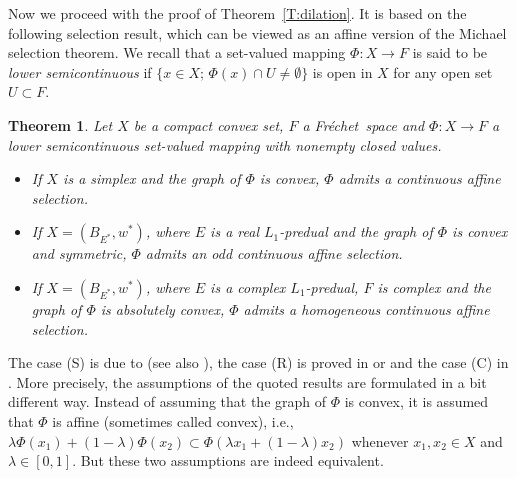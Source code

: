 \documentclass{amsart}
\numberwithin{equation}{section}
\newtheorem{thm}{Theorem}[section]
\theoremstyle{definition}
\newcommand{\setsep}{;\,}
\newcommand{\fr}{Fr\'echet\ }
\begin{document}
Now we proceed with the proof of Theorem~\ref{T:dilation}. It is based on the following selection result, which can be viewed as an affine version of the Michael selection theorem. We recall that a set-valued mapping $\Phi\colon X\to F$ is said to be
\emph{lower semicontinuous} if $\{x\in X\setsep \Phi(x)\cap U\ne\emptyset\}$ is open in $X$ for any open set $U\subset F$.

\begin{thm}\label{T:selekcelsc}
Let $X$ be a compact convex set, $F$ a \fr space and $\Phi\colon X\to F$ a lower semicontinuous set-valued mapping with nonempty closed values.
\begin{itemize}
	\item[(S)] If $X$ is a simplex  and the graph of $\Phi$ is convex, $\Phi$ admits a continuous affine selection.
	\item[(R)] If $X=(B_{E^*},w^*)$, where $E$ is a real $L_1$-predual and the graph of $\Phi$ is convex and symmetric, $\Phi$ admits an odd continuous affine selection.
	\item[(C)] If $X=(B_{E^*},w^*)$, where $E$ is a complex $L_1$-predual, $F$ is complex and the graph of $\Phi$ is absolutely convex, $\Phi$ admits a homogeneous continuous affine selection.
\end{itemize}
\end{thm}

The case (S) is due to \cite[Theorem 3.1]{lazar-sel} (see also \cite[Theorem 11.6]{lmns}), the case (R) is proved in \cite[Theorem 2.2]{lali} or \cite[Chapter 7, \S 22, Theorem 2]{lacey} and the case (C) in \cite[Theorem 4.2]{olsen-sel}. More precisely, the assumptions of the quoted results are formulated
in a bit different way. Instead of assuming that the graph of $\Phi$ is convex, it is assumed that $\Phi$ is affine (sometimes called convex), i.e.,
$\lambda\Phi(x_1)+(1-\lambda)\Phi(x_2)\subset\Phi(\lambda x_1+(1-\lambda)x_2)$ whenever $x_1,x_2\in X$ and $\lambda\in[0,1]$. But these two assumptions are indeed equivalent.
\end{document}
